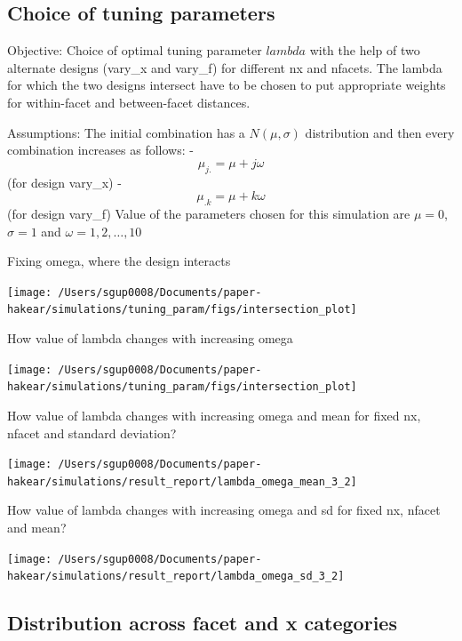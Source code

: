 \documentclass[
]{article}
\begin{document}
\hypertarget{choice-of-tuning-parameters}{%
\subsection{Choice of tuning parameters}\label{choice-of-tuning-parameters}}

Objective: Choice of optimal tuning parameter \(lambda\) with the help of two alternate designs (vary\_x and vary\_f) for different nx and nfacets. The lambda for which the two designs intersect have to be chosen to put appropriate weights for within-facet and between-facet distances.

Assumptions: The initial combination has a \(N(\mu,\sigma)\) distribution and then every combination increases as follows:
- \[\mu_{j.} = \mu + j\omega\] (for design vary\_x)
- \[\mu_{.k} = \mu + k\omega\] (for design vary\_f)
Value of the parameters chosen for this simulation are \(\mu = 0\), \(\sigma = 1\) and \(\omega = {1, 2, \dots, 10}\)

Fixing omega, where the design interacts

\begin{center}\texttt{[image: /Users/sgup0008/Documents/paper-hakear/simulations/tuning\_param/figs/intersection\_plot]} \end{center}

How value of lambda changes with increasing omega

\begin{center}\texttt{[image: /Users/sgup0008/Documents/paper-hakear/simulations/tuning\_param/figs/intersection\_plot]} \end{center}

How value of lambda changes with increasing omega and mean for fixed nx, nfacet and standard deviation?

\begin{center}\texttt{[image: /Users/sgup0008/Documents/paper-hakear/simulations/result\_report/lambda\_omega\_mean\_3\_2]} \end{center}

How value of lambda changes with increasing omega and sd for fixed nx, nfacet and mean?

\begin{center}\texttt{[image: /Users/sgup0008/Documents/paper-hakear/simulations/result\_report/lambda\_omega\_sd\_3\_2]} \end{center}

\hypertarget{distribution-across-facet-and-x-categories}{%
\subsection{Distribution across facet and x categories}\label{distribution-across-facet-and-x-categories}}
\end{document}
